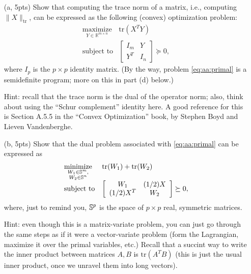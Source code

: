 \documentclass{article}
\theoremstyle{remark}
\theoremstyle{definition}
\newcommand{\minimize}{\mathop{\mathrm{minimize}}}
\newcommand{\maximize}{\mathop{\mathrm{maximize}}}
\newcommand{\minimizewrt}[1]{\underset{#1}{\minimize}}
\newcommand{\maximizewrt}[1]{\underset{#1}{\maximize}}
\newcommand{\subjectto}{\mbox{subject to}}
\def\tr{\mathrm{tr}}
\begin{document}
\begin{enumerate}
\item[(a, 5pts)]
Show that computing the trace norm of a matrix, i.e., computing $\| X \|_{\tr}$, can be expressed as the following (convex) optimization problem:
\begin{equation}
\begin{array}{ll}
\maximizewrt{Y \in \mathbb{R}^{m \times n}} & \tr(X^T Y) \\
\subjectto & 
\left[
\begin{array}{cc}
I_m & Y \\
Y^T & I_n
\end{array}
\right]
\succeq 0,
\end{array}
\label{eq:aa:primal}
\end{equation}
where $I_p$ is the $p \times p$ identity matrix.  (By the way, problem \eqref{eq:aa:primal} is a semidefinite program; more on this in part (d) below.)

Hint: recall that the trace norm is the dual of the operator norm; also, think
about using the ``Schur complement'' identity here.  A good reference for this
is Section A.5.5 in the ``Convex Optimization'' book, by Stephen Boyd and
Lieven Vandenberghe. 

\item[(b, 5pts)]
Show that the dual problem associated with \eqref{eq:aa:primal} can be expressed as
\begin{equation}
\begin{array}{ll}
\minimizewrt{\substack{W_{1} \in \symm^{m}, \\ W_{2} \in \symm^{n}}} & \tr(W_{1}) + \tr(W_{2}) \\
\subjectto & 
\left[
\begin{array}{cc}
W_{1} & (1/2) X \\
(1/2) X^T & W_{2}
\end{array}
\right]
\succeq 0,
\end{array}
\label{eq:aa:dual}
\end{equation}
where, just to remind you, $\mathbb{S}^p$ is the space of $p \times p$ real,
symmetric matrices.

Hint: even though this is a matrix-variate problem, you can just go through the
same steps as if it were a vector-variate problem (form the Lagrangian, maximize
it over the primal variables, etc.)  Recall that a succint way to write the
inner product between matrices $A,B$ is $\tr(A^T B)$ (this is just the usual
inner product, once we unravel them into long vectors).


\end{enumerate}
\end{document}
